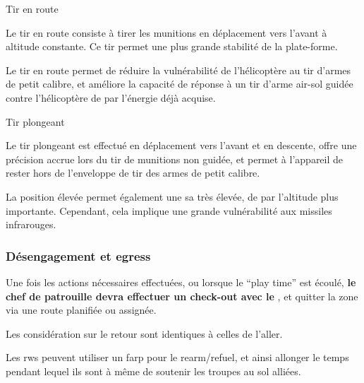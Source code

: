 	\item Tir en route

	\ee
		\item Le tir en route consiste à tirer les munitions en déplacement vers l'avant à altitude constante. Ce tir permet une plus grande stabilité de la plate-forme.
		\item
		Le tir en route permet de réduire la vulnérabilité de l'hélicoptère au tir d'armes de petit calibre, et améliore la capacité de réponse à un tir d'arme air-sol guidée contre l'hélicoptère de par l'énergie déjà acquise.
	\ed

	\item Tir plongeant

	\ee
		\item
		Le tir plongeant est effectué en déplacement vers l'avant et en descente, offre une précision accrue lors du tir de munitions non guidée, et permet à l'appareil de rester hors de l'enveloppe de tir des armes de petit calibre.
	
		\item
		La position élevée permet également une \gls{sa} très élevée, de par l'altitude plus importante. Cependant, cela implique une grande vulnérabilité aux missiles infrarouges.
	\ed
\ed

\subsubsection{Désengagement et egress}

\e
	\item
	Une fois les actions nécessaires effectuées, ou lorsque le ``play time'' est écoulé, \textbf{le chef de patrouille devra effectuer un check-out avec le \ja{}}, et quitter la zone via une route planifiée ou assignée.
	\item Les considération sur le retour sont identiques à celles de l'aller.
	\item Les \gls{rw}s peuvent utiliser un \gls{farp} pour le rearm/refuel, et ainsi allonger le temps pendant lequel ils sont à même de soutenir les troupes au sol alliées.

	\item {}

\ed

